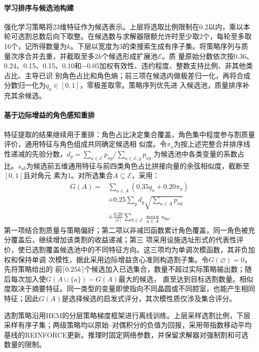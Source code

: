 \documentclass[final,5p,times,twocolumn]{elsarticle}
\begin{document}
\paragraph{学习排序与候选池构建}
强化学习策略将23维特征作为候选表示。上层将选取比例限制在0.2以内，乘以本轮可选割总数后向下取整。在候选数与求解器限额允许时至少取2个，每轮至多取16个，记所得数量为$k$。下层以宽度为3的束搜索生成有序子集。将策略序列与质量次序合并去重，并截取至多$2k$个候选形成扩展池$\mathcal E$。质
量原始分数依次按0.36、0.24、0.15、0.15、0.10和$-0.05$加权有效性、违约程度、整数支持比例、非其他类占比、主导已识
别角色占比和角色熵；前三项在候选内做极差归一化，再将合成分数归一化为$q_a\in[0,1]$，零极差取零。策略序列优先进
入候选池，质量排序补充其余候选。

\paragraph{基于边际增益的角色感知重排}
特征提取的结果继续用于重排：角色占比决定集合覆盖，角色集中程度参与割质量评价，通用特征与角色组成共同确定候选相
似度。令$\pi_a$为按上述完整合并排序线性递减的先验分数，$d_g=\sum_{a\in\mathcal E}p_{ag}/\sum_{a\in\mathcal E,g}p_{ag}$
为候选池中各类变量的系数占比。$s_{ab}$为候选前五维通用特征与前四类角色占比拼接向量的余弦相似度，截断至$[0,1]$且对角元
素为1。对所选集合$A\subseteq\mathcal E$，采用：
\begin{equation}
\begin{aligned}
G(A)={}&\sum_{a\in A}(0.35q_a+0.20\pi_a)\\
&+0.25\sum_gd_g\sqrt{\sum_{a\in A}p_{ag}}\\
&+\frac{0.20}{|\mathcal E|}\sum_{b\in\mathcal E}\max_{a\in A}s_{ba}.
\end{aligned}
\label{eq:cut-rerank-cn}
\end{equation}
第一项结合割质量与策略偏好；第二项以非减凹函数累计角色覆盖，同一角色被充分覆盖后，继续增加该类割的收益递减；第三
项采用设施选址形式的代表性评价，使已选割覆盖候选池中的不同特征方向。这三项均为单调次模函数，其非负加权和保持单调
次模性\citep{krause2014submodular}，据此采用边际增益贪心准则构造割子集。令$G(\varnothing)=0$，先将策略给出的
前$\lceil0.25k\rceil$个候选加入已选集合，数量不超过实际策略输出数；随后每次加入使$G(A\cup\{a\})-G(A)$最大的候选，
直至达到目标选割数量。相似度取决于摘要特征。同一类型的变量即使指向不同晶圆或不同腔室，也能产生相同特征；因此$G(A)$是选择候选的启发式评分，其次模性质仅涉及集合评分。

选割策略沿用HEM的分层策略梯度框架进行离线训练\citep{wang2023hem}。上层采样选割比例，下层采样有序子集；两级策略均以原始--对偶积分的负值为回报，采用带指数移动平均基线的REINFORCE更新。推理时固定网络参数，并保留求解器对强制割和可选数量的限制。
\end{document}
